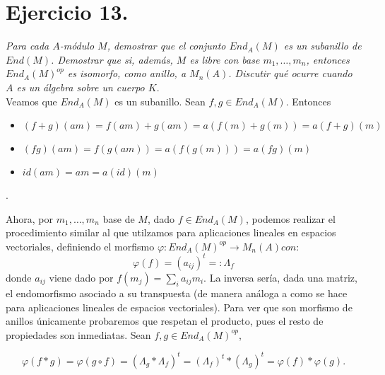 \section{Ejercicio 13.}%
\label{sec:ejercicio_13_}

\textit{Para cada \(A\)-módulo \(M\), demostrar que el conjunto \(End_A(M)\) es un subanillo de \(End(M)\). Demostrar que si, además, \(M\) es libre con base \(m_1, \dots, m_n\), entonces \(End_A(M)^{op}\) es isomorfo, como anillo, a  \(M_n(A)\). Discutir qué ocurre cuando  \(A\) es un álgebra sobre un cuerpo \(K\)}.
\\

Veamos que \(End_A(M)\) es un subanillo. Sean \(f,g \in End_A(M)\). Entonces
\begin{itemize}
    \item \((f+g)(am) = f(am) + g(am) = a(f(m) + g(m)) = a(f+g)(m)\)
    \item \((fg)(am) = f(g(am)) = a(f(g(m)))= a(fg)(m) \)
    \item \(id(am) = am = a(id)(m)\)
\end{itemize}.

Ahora, por \(m_1, \dots, m_n\) base de \(M\), dado \(f \in End_A(M)\), podemos realizar el procedimiento similar al que utilzamos para aplicaciones lineales en espacios vectoriales, definiendo el morfismo \(\varphi: End_A(M)^{op} \rightarrow M_n(A) con\):
\[
\varphi(f) = (a_{ij})^t =: \Lambda_f
\]
donde \(a_{ij}\) viene dado por \(f(m_j) = \sum_i a_{ij} m_i\). La inversa sería, dada una matriz, el endomorfismo asociado a su transpuesta (de manera análoga a como se hace para aplicaciones lineales de espacios vectoriales). Para ver que son morfismo de anillos únicamente probaremos que respetan el producto, pues el resto de propiedades son inmediatas. Sean \(f, g \in End_A(M)^{op}\),

\[
    \varphi(f*g) = \varphi(g \circ f) = (\Lambda_g * \Lambda_f)^t = (\Lambda_f)^t * (\Lambda_g)^t = \varphi(f) * \varphi(g)
.\]
